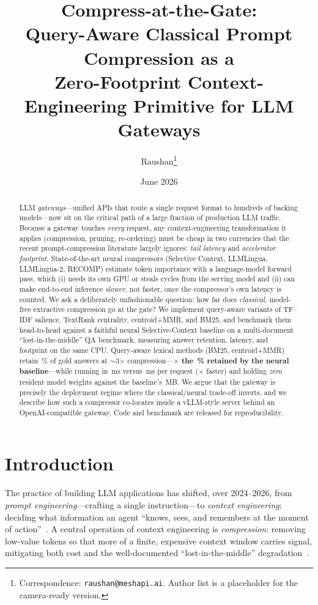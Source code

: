 \documentclass[11pt]{article}
\title{\textbf{Compress-at-the-Gate:\\ Query-Aware Classical Prompt Compression as a\\ Zero-Footprint Context-Engineering Primitive for LLM Gateways}}
\author[1]{Raushan\thanks{Correspondence: \texttt{raushan@meshapi.ai}. Author list is a placeholder for the camera-ready version.}}
\affil[1]{Mesh API / AI Fiesta}
\date{June 2026}
\begin{document}
\maketitle

\begin{abstract}
\noindent
LLM \emph{gateways}---unified APIs that route a single request format to hundreds of
backing models---now sit on the critical path of a large fraction of production
LLM traffic. Because a gateway touches \emph{every} request, any context-engineering
transformation it applies (compression, pruning, re-ordering) must be cheap in two
currencies that the recent prompt-compression literature largely ignores:
\emph{tail latency} and \emph{accelerator footprint}. State-of-the-art neural
compressors (Selective Context, LLMLingua, LLMLingua-2, RECOMP) estimate token
importance with a language-model forward pass, which (i) needs its own GPU or steals
cycles from the serving model and (ii) can make end-to-end inference \emph{slower},
not faster, once the compressor's own latency is counted. We ask a deliberately
unfashionable question: how far does \emph{classical}, model-free extractive
compression go at the gate? We implement query-aware variants of TF--IDF salience,
TextRank centrality, centroid+MMR, and BM25, and benchmark them head-to-head against
a faithful neural Selective-Context baseline on a multi-document ``lost-in-the-middle''
QA benchmark, measuring answer retention, latency, and footprint on the same CPU.
Query-aware lexical methods (BM25, centroid+MMR) retain \retBMQ\,\% of gold answers at
$\sim$3$\times$ compression---\textbf{\retGainNeuralX$\times$ the \retNeural\,\% retained
by the neural baseline}---while running in \latBMQ\,ms versus \latNeural\,ms per
request (\latSpeedup$\times$ faster) and holding \emph{zero} resident model weights
against the baseline's \neuralParamMB\,MB. We argue that the gateway is precisely the
deployment regime where the classical/neural trade-off inverts, and we describe how
such a compressor co-locates inside a vLLM-style server behind an OpenAI-compatible
gateway. Code and benchmark are released for reproducibility.
\end{abstract}

\section{Introduction}
The practice of building LLM applications has shifted, over 2024--2026, from
\emph{prompt engineering}---crafting a single instruction---to \emph{context
engineering}: deciding what information an agent ``knows, sees, and remembers at the
moment of action''~\cite{contexteng2026}. A central operation of context engineering
is \emph{compression}: removing low-value tokens so that more of a finite, expensive
context window carries signal, mitigating both cost and the well-documented
``lost-in-the-middle'' degradation~\cite{lostmiddle}.
\end{document}
